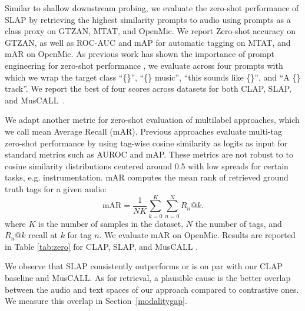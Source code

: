 \documentclass{article}
\newcommand{\mAR}{\text{mAR}}
\newcommand{\comm}[1]{\textcolor{red}{TODO #1}}
\begin{document}
Similar to shallow downstream probing, we evaluate the zero-shot performance of SLAP by retrieving the highest similarity prompts to audio using prompts as a class proxy on GTZAN, MTAT, and OpenMic. We report Zero-shot accuracy on GTZAN, as well as ROC-AUC and mAP for automatic tagging on MTAT, and mAR on OpenMic. As previous work has shown the importance of prompt engineering for zero-shot performance \cite{manco2022contrastive}, we evaluate across four prompts with which we wrap the target class ``\{\}'', ``\{\} music'', ``this sounds like \{\}'', and ``A \{\} track''.
We report the best of four scores across datasets for both CLAP, SLAP, and MusCALL~\cite{manco2022contrastive}.

We adapt another metric for zero-shot evaluation of multilabel approaches, which we call mean Average Recall (mAR). Previous approaches evaluate multi-tag zero-shot performance by using tag-wise cosine similarity as logits as input for standard metrics such as AUROC and mAP. These metrics are not robust to to cosine similarity distributions centered around 0.5 with low spreads for certain tasks, e.g. instrumentation.
mAR computes the mean rank of retrieved ground truth tags for a given audio:%
\begin{equation}
    \mAR = \frac{1}{NK} \sum_{k=0}^K \sum_{n=0}^N R_n@k.
\end{equation}
where $K$ is the number of samples in the dataset, $N$ the number of tags, and $R_n@k$ recall at $k$ for tag $n$. We evaluate mAR on OpenMic. Results are reported in Table \ref{tab:zero} for CLAP, SLAP, and MusCALL \cite{manco2022contrastive}.

We observe that SLAP consistently outperforms or is on par with our CLAP baseline and MusCALL.
As for retrieval, a plausible cause is the better overlap between the audio and text spaces of our approach compared to contrastive ones. We measure this overlap in Section~\ref{modalitygap}.

\end{document}
